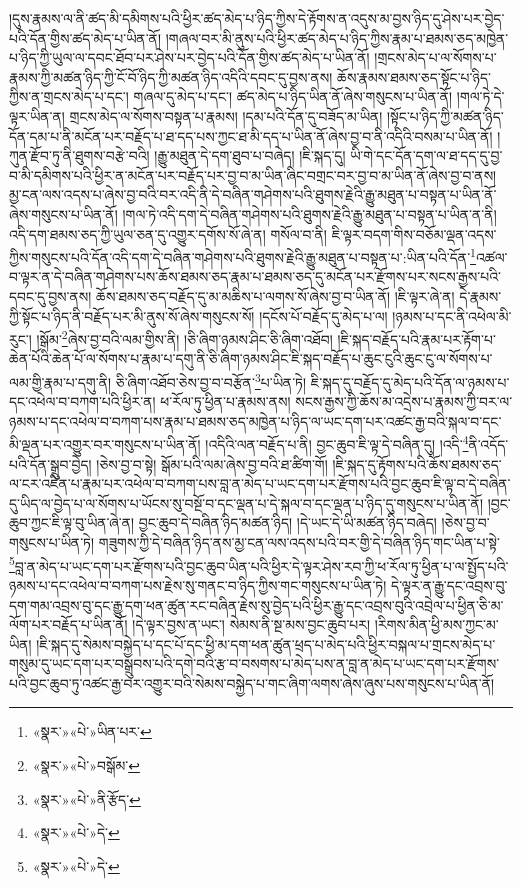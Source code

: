 །དུས་རྣམས་ལ་ནི་ཚད་མི་དམིགས་པའི་ཕྱིར་ཚད་མེད་པ་ཉིད་ཀྱིས་དེ་རྟོགས་ན་འདུས་མ་བྱས་ཉིད་དུ་ཤེས་པར་བྱེད་པའི་དོན་གྱིས་ཚད་མེད་པ་ཡིན་ནོ། །གཞལ་བར་མི་ནུས་པའི་ཕྱིར་ཚད་མེད་པ་ཉིད་ཀྱིས་རྣམ་པ་ཐམས་ཅད་མཁྱེན་པ་ཉིད་ཀྱི་ཡུལ་ལ་དབང་ཐོབ་པར་ཤེས་པར་བྱེད་པའི་དོན་གྱིས་ཚད་མེད་པ་ཡིན་ནོ། །གྲངས་མེད་པ་ལ་སོགས་པ་རྣམས་ཀྱི་མཚན་ཉིད་ཀྱི་ངོ་བོ་ཉིད་ཀྱི་མཚན་ཉིད་འདིའི་དབང་དུ་བྱས་ནས། ཆོས་རྣམས་ཐམས་ཅད་སྟོང་པ་ཉིད་ཀྱིས་ན་གྲངས་མེད་པ་དང་། གཞལ་དུ་མེད་པ་དང་། ཚད་མེད་པ་ཉིད་ཡིན་ནོ་ཞེས་གསུངས་པ་ཡིན་ནོ། །གལ་ཏེ་དེ་ལྟར་ཡིན་ན། གྲངས་མེད་ལ་སོགས་བསྟན་པ་རྣམས། །དམ་པའི་དོན་དུ་བཟོད་མ་ཡིན། །སྟོང་པ་ཉིད་ཀྱི་མཚན་ཉིད་དོན་དམ་པ་ནི་མངོན་པར་བརྗོད་པ་ཐ་དད་པས་ཀྱང་ཐ་མི་དད་པ་ཡིན་ནོ་ཞེས་བྱ་བ་ནི་འདིའི་བསམ་པ་ཡིན་ནོ། །
ཀུན་རྫོབ་ཏུ་ནི་ཐུགས་བརྩེ་བའི། །རྒྱུ་མཐུན་དེ་དག་ཐུབ་པ་བཞེད། །ཇི་སྐད་དུ། ཡི་གེ་དང་དོན་དག་ལ་ཐ་དད་དུ་བྱ་བ་མི་དམིགས་པའི་ཕྱིར་ན་མངོན་པར་བརྗོད་པར་བྱ་བ་མ་ཡིན་ཞིང་བགྲང་བར་བྱ་བ་མ་ཡིན་ནོ་ཞེས་བྱ་བ་ནས། མྱ་ངན་ལས་འདས་པ་ཞེས་བྱ་བའི་བར་འདི་ནི་དེ་བཞིན་གཤེགས་པའི་ཐུགས་རྗེའི་རྒྱུ་མཐུན་པ་བསྟན་པ་ཡིན་ནོ་ཞེས་གསུངས་པ་ཡིན་ནོ། །གལ་ཏེ་འདི་དག་དེ་བཞིན་གཤེགས་པའི་ཐུགས་རྗེའི་རྒྱུ་མཐུན་པ་བསྟན་པ་ཡིན་ན་ནི། འདི་དག་ཐམས་ཅད་ཀྱི་ཡུལ་ཅན་དུ་འགྱུར་དགོས་སོ་ཞེ་ན། གསོལ་བ་ནི། ཇི་ལྟར་བདག་གིས་བཅོམ་ལྡན་འདས་ཀྱིས་གསུངས་པའི་དོན་འདི་དག་དེ་བཞིན་གཤེགས་པའི་ཐུགས་རྗེའི་རྒྱུ་མཐུན་པ་བསྟན་པ་:ཡིན་པའི་དོན་\footnote{«སྣར་»«པེ་»ཡིན་པར་}འཚལ་བ་ལྟར་ན་དེ་བཞིན་གཤེགས་པས་ཆོས་ཐམས་ཅད་རྣམ་པ་ཐམས་ཅད་དུ་མངོན་པར་རྫོགས་པར་སངས་རྒྱས་པའི་དབང་དུ་བྱས་ནས། ཆོས་ཐམས་ཅད་བརྗོད་དུ་མ་མཆིས་པ་ལགས་སོ་ཞེས་བྱ་བ་ཡིན་ནོ། །ཇི་ལྟར་ཞེ་ན། དེ་རྣམས་ཀྱི་སྟོང་པ་ཉིད་ནི་བརྗོད་པར་མི་ནུས་སོ་ཞེས་གསུངས་སོ། །དངོས་པོ་བརྗོད་དུ་མེད་པ་ལ། །ཉམས་པ་དང་ནི་འཕེལ་མི་རུང་། །སྒོམ་\footnote{«སྣར་»«པེ་»བསྒོམ་}ཞེས་བྱ་བའི་ལམ་གྱིས་ནི། །ཅི་ཞིག་ཉམས་ཤིང་ཅི་ཞིག་འཐོབ། །ཇི་སྐད་བརྗོད་པའི་རྣམ་པར་རྟོག་པ་ཆེན་པོའི་ཆེན་པོ་ལ་སོགས་པ་རྣམ་པ་དགུ་ནི་ཅི་ཞིག་ཉམས་ཤིང་ཇི་སྐད་བརྗོད་པ་ཆུང་ངུའི་ཆུང་ངུ་ལ་སོགས་པ་ལམ་གྱི་རྣམ་པ་དགུ་ནི། ཅི་ཞིག་འཐོབ་ཅེས་བྱ་བ་བརྩོན་\footnote{«སྣར་»«པེ་»ནི་རྩོད་}པ་ཡིན་ཏེ། ཇི་སྐད་དུ་བརྗོད་དུ་མེད་པའི་དོན་ལ་ཉམས་པ་དང་འཕེལ་བ་བཀག་པའི་ཕྱིར་ན། ཕ་རོལ་ཏུ་ཕྱིན་པ་རྣམས་ནས། སངས་རྒྱས་ཀྱི་ཆོས་མ་འདྲེས་པ་རྣམས་ཀྱི་བར་ལ་ཉམས་པ་དང་འཕེལ་བ་བཀག་པས་རྣམ་པ་ཐམས་ཅད་མཁྱེན་པ་ཉིད་ལ་ཡང་དག་པར་འཚང་རྒྱ་བའི་སྐལ་བ་དང་མི་ལྡན་པར་འགྱུར་བར་གསུངས་པ་ཡིན་ནོ། །འདིའི་ལན་བརྗོད་པ་ནི། བྱང་ཆུབ་ཇི་ལྟ་དེ་བཞིན་དུ། །འདི་\footnote{«སྣར་»«པེ་»དེ་}ནི་འདོད་པའི་དོན་སྒྲུབ་བྱེད། །ཅེས་བྱ་བ་སྟེ། སྒོམ་པའི་ལམ་ཞེས་བྱ་བའི་ཐ་ཚིག་གོ། །ཇི་སྐད་དུ་རྟོགས་པའི་ཆོས་ཐམས་ཅད་ལ་ངར་འཛིན་པ་རྣམ་པར་འཕེལ་བ་བཀག་པས་བླ་ན་མེད་པ་ཡང་དག་པར་རྫོགས་པའི་བྱང་ཆུབ་ཇི་ལྟ་བ་དེ་བཞིན་དུ་ཡིད་ལ་བྱེད་པ་ལ་སོགས་པ་ཡོངས་སུ་བསྔོ་བ་དང་ལྡན་པ་དེ་སྐལ་བ་དང་ལྡན་པ་ཉིད་དུ་གསུངས་པ་ཡིན་ནོ། །བྱང་ཆུབ་ཀྱང་ཇི་ལྟ་བུ་ཡིན་ཞེ་ན། བྱང་ཆུབ་དེ་བཞིན་ཉིད་མཚན་ཉིད། །དེ་ཡང་དེ་ཡི་མཚན་ཉིད་བཞེད། །ཅེས་བྱ་བ་གསུངས་པ་ཡིན་ཏེ། གཟུགས་ཀྱི་དེ་བཞིན་ཉིད་ནས་མྱ་ངན་ལས་འདས་པའི་བར་གྱི་དེ་བཞིན་ཉིད་གང་ཡིན་པ་སྟེ་\footnote{«སྣར་»«པེ་»དེ་}བླ་ན་མེད་པ་ཡང་དག་པར་རྫོགས་པའི་བྱང་ཆུབ་ཡིན་པའི་ཕྱིར་དེ་ལྟར་ཤེས་རབ་ཀྱི་ཕ་རོལ་ཏུ་ཕྱིན་པ་ལ་སྤྱོད་པའི་ཉམས་པ་དང་འཕེལ་བ་བཀག་པས་རྗེས་སུ་གནང་བ་ཉིད་ཀྱིས་གང་གསུངས་པ་ཡིན་ཏེ། དེ་ལྟར་ན་རྒྱུ་དང་འབྲས་བུ་དག་གམ་འབྲས་བུ་དང་རྒྱུ་དག་ཕན་ཚུན་རང་བཞིན་རྗེས་སུ་བྱེད་པའི་ཕྱིར་རྒྱུ་དང་འབྲས་བུའི་འབྲེལ་པ་ཕྱིན་ཅི་མ་ལོག་པར་བརྗོད་པ་ཡིན་ནོ། །དེ་ལྟར་བྱས་ན་ཡང་། སེམས་ནི་སྔ་མས་བྱང་ཆུབ་པར། །རིགས་མིན་ཕྱི་མས་ཀྱང་མ་ཡིན། །ཇི་སྐད་དུ་སེམས་བསྐྱེད་པ་དང་པོ་དང་ཕྱི་མ་དག་ཕན་ཚུན་ཕྲད་པ་མེད་པའི་ཕྱིར་བསྐལ་པ་གྲངས་མེད་པ་གསུམ་དུ་ཡང་དག་པར་བསྒྲུབས་པའི་དགེ་བའི་རྩ་བ་བསགས་པ་མེད་པས་ན་བླ་ན་མེད་པ་ཡང་དག་པར་རྫོགས་པའི་བྱང་ཆུབ་ཏུ་འཚང་རྒྱ་བར་འགྱུར་བའི་སེམས་བསྐྱེད་པ་གང་ཞིག་ལགས་ཞེས་ཞུས་པས་གསུངས་པ་ཡིན་ནོ། 